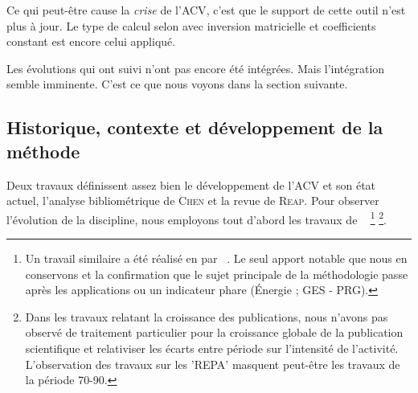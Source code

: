 Ce qui peut-être cause la \emph{crise} de l'\gls{ACV}, c'est que le support de cette outil n'est plus à jour.
Le type de calcul selon \citeauthor{leontief_environmental_1970} avec inversion matricielle et coefficients constant est encore celui appliqué.

Les évolutions qui ont suivi n'ont pas encore été intégrées.
Mais l'intégration semble imminente.
C'est ce que nous voyons dans la section suivante.

\subsection{Historique, contexte et développement de la méthode}
\label{subsec:Historique de la méthode, son développement, son contexte}
Deux travaux définissent assez bien le développement de l'ACV et son état actuel, l'analyse bibliométrique de \textsc{Chen} et la revue de \textsc{Reap}.
Pour observer l'évolution de la discipline, nous employons tout d'abord les travaux de \citeauthor{chen_bibliometric_2014}~\cite{chen_bibliometric_2014}
\footnote{
Un travail similaire a été réalisé en  par \citeauthor{hou_mapping_2015}~\cite{hou_mapping_2015}. Le seul apport notable que nous en conservons et la confirmation que le sujet principale de la méthodologie passe après les applications ou un indicateur phare (Énergie ; GES - PRG).
}
\footnote{
Dans les travaux relatant la croissance des publications, nous n'avons pas observé de traitement particulier pour la croissance globale de la publication scientifique et relativiser les écarts entre période sur l'intensité de l'activité.
L'observation des travaux sur les 'REPA' masquent peut-être les travaux de la période 70-90.
}.


